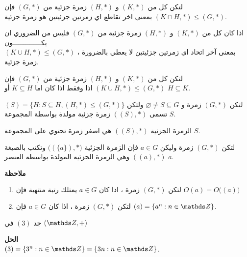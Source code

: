    \begin{theorem}
   	لتكن كل من $(K, *)$ و $(H, *)$ زمرة جزئية من $(G, *)$ فإن $(K \cap H, *) \leq (G, *)$ بمعنى اخر تقاطع اي زمرتين جزئيتين هو زمرة جزئية.
   \end{theorem}
   \begin{note}
   	اذا كان كل من $(K, *)$ و $(H, *)$ زمرة جزئية من $(G, *)$  فليس من الضروري ان يكــــــــــــــون \\
   	$(K \cup H, *) \leq (G, *)$  ، بمعنى آخر اتحاد اي زمرتين جزئيتين لا يعطي بالضرورة زمرة جزئية.
   \end{note}
   
   \begin{theorem}
   	 	لتكن كل من $(K, *)$ و $(H, *)$ زمرة جزئية من $(G, *)$ فإن $(K \cup H, *) \leq (G, *)$ اذا وفقط اذا كان اما $K\subseteq H$ أو $H\subseteq K$.
   \end{theorem}
   
   \begin{definition}
   	لتكن $(G, *)$ زمرة و $\varnothing\neq S\subseteq G$ ولتكن
   	$(S) = \{H : S\subseteq H , (H, *) \leq (G, *)\}$
   	تسمى $((S), *)$ زمرة جزئية مولدة بواسطة المجموعة $S$.
   \end{definition}
   
   \begin{note}
   	الزمرة الجزئية $((S), *)$ هي اصغر زمرة تحتوي على المجموعة $S$.
   \end{note}
   
\begin{definition}
	لتكن $(G, *)$ زمرة وليكن $a\in G$ فإن الزمرة الجزئية 	$\big((\{a\}) , *\big)$ وتكتب بالصيغة $((a), *) $ وهي الزمرة الجزئية المولدة بواسطة العنصر $a$.
\end{definition}

\noindent
\textbf{ملاحظة}
\begin{enumerate}
	\item لتكن $(G, *)$ زمرة ، اذا كان $a\in G$ يمتلك رتبة منتهية فإن $O(a) = O\Big((a)\Big)$
	\item  لتكن $(G, *)$ زمرة ، اذا كان $a\in G$ فإن $(a) = \{a^n : n\in \Z\}$.
\end{enumerate}

\begin{example}
	جد $(3)$ في $(\Z, +)$
\end{example}
   \noindent
   \textbf{الحل}\\
   \noindent
   $(3) = \{3^n : n\in \Z\} = \{3n : n\in \Z\}$.
   

